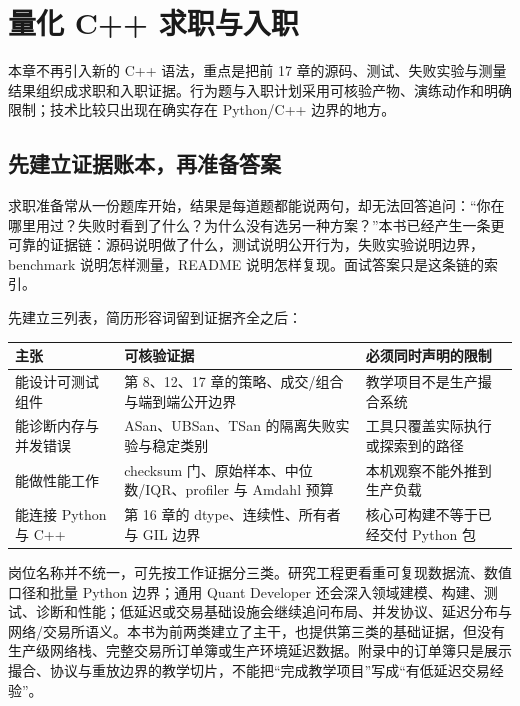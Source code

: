 \chapter{量化 C++ 求职与入职}


本章不再引入新的 C++ 语法，重点是把前 17 章的源码、测试、失败实验与测量结果组织成求职和入职证据。行为题与入职计划采用可核验产物、演练动作和明确限制；技术比较只出现在确实存在 Python/C++ 边界的地方。

\section{先建立证据账本，再准备答案}

求职准备常从一份题库开始，结果是每道题都能说两句，却无法回答追问：“你在哪里用过？失败时看到了什么？为什么没有选另一种方案？”本书已经产生一条更可靠的证据链：源码说明做了什么，测试说明公开行为，失败实验说明边界，benchmark 说明怎样测量，README 说明怎样复现。面试答案只是这条链的索引。

先建立三列表，简历形容词留到证据齐全之后：

\begin{center}
\begin{tabularx}{\textwidth}{@{}p{}X p{}@{}}
\toprule
主张 & 可核验证据 & 必须同时声明的限制 \\
\midrule
能设计可测试组件 & 第 8、12、17 章的策略、成交/组合与端到端公开边界& 教学项目不是生产撮合系统 \\
能诊断内存与并发错误 & ASan、UBSan、TSan 的隔离失败实验与稳定类别 & 工具只覆盖实际执行或探索到的路径 \\
能做性能工作 & checksum 门、原始样本、中位数/IQR、profiler 与 Amdahl 预算 & 本机观察不能外推到生产负载 \\
能连接 Python 与 C++ & 第 16 章的 dtype、连续性、所有者与 GIL 边界 & 核心可构建不等于已经交付 Python 包 \\
\bottomrule
\end{tabularx}
\end{center}

岗位名称并不统一，可先按工作证据分三类。研究工程更看重可复现数据流、数值口径和批量 Python 边界；通用 Quant Developer 还会深入领域建模、构建、测试、诊断和性能；低延迟或交易基础设施会继续追问布局、并发协议、延迟分布与网络/交易所语义。本书为前两类建立了主干，也提供第三类的基础证据，但没有生产级网络栈、完整交易所订单簿或生产环境延迟数据。附录中的订单簿只是展示撮合、协议与重放边界的教学切片，不能把“完成教学项目”写成“有低延迟交易经验”。

